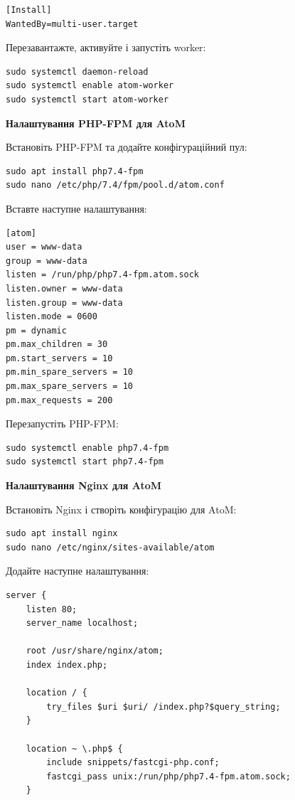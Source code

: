 \documentclass[14pt,a4paper]{article}
\begin{document}
\begin{large}
\begin{lstlisting}
[Install]
WantedBy=multi-user.target
\end{lstlisting}

Перезавантажте, активуйте і запустіть worker:

\begin{lstlisting}
sudo systemctl daemon-reload
sudo systemctl enable atom-worker
sudo systemctl start atom-worker
\end{lstlisting}

\textbf{Налаштування PHP-FPM для AtoM}

Встановіть PHP-FPM та додайте конфігураційний пул:

\begin{lstlisting}
sudo apt install php7.4-fpm
sudo nano /etc/php/7.4/fpm/pool.d/atom.conf
\end{lstlisting}

Вставте наступне налаштування:

\begin{lstlisting}
[atom]
user = www-data
group = www-data
listen = /run/php/php7.4-fpm.atom.sock
listen.owner = www-data
listen.group = www-data
listen.mode = 0600
pm = dynamic
pm.max_children = 30
pm.start_servers = 10
pm.min_spare_servers = 10
pm.max_spare_servers = 10
pm.max_requests = 200
\end{lstlisting}

Перезапустіть PHP-FPM:

\begin{lstlisting}
sudo systemctl enable php7.4-fpm
sudo systemctl start php7.4-fpm
\end{lstlisting}

\textbf{Налаштування Nginx для AtoM}

Встановіть Nginx і створіть конфігурацію для AtoM:

\begin{lstlisting}
sudo apt install nginx
sudo nano /etc/nginx/sites-available/atom
\end{lstlisting}

Додайте наступне налаштування:

\begin{lstlisting}
server {
    listen 80;
    server_name localhost;

    root /usr/share/nginx/atom;
    index index.php;

    location / {
        try_files $uri $uri/ /index.php?$query_string;
    }

    location ~ \.php$ {
        include snippets/fastcgi-php.conf;
        fastcgi_pass unix:/run/php/php7.4-fpm.atom.sock;
    }


\end{lstlisting}
\end{large}
\end{document}
